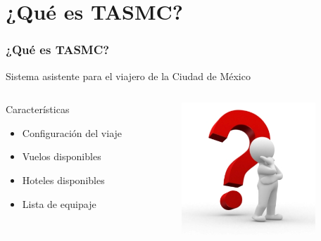 \documentclass[12pt]{beamer}
\begin{document}
\section{¿Qué es TASMC?}
\begin{frame}[c]
	\frametitle{¿Qué es TASMC?}
	\begin{block}{}
		Sistema asistente para el viajero de la Ciudad de México
	\end{block}
	\begin{columns} 
		\begin{column}{5cm}
			\begin{block}{Características} \small 
				\begin{itemize}
					\item Configuración del viaje
					\item Vuelos disponibles
					\item Hoteles disponibles
					\item Lista de equipaje
				\end{itemize} 
			\end{block} 
		\end{column}
		\begin{column}{4cm} 
			\begin{center}
				\includegraphics[height=5cm]{imagenes/queEs.jpg}
			\end{center} 
		\end{column} 
	\end{columns}
\end{frame}
\end{document}
